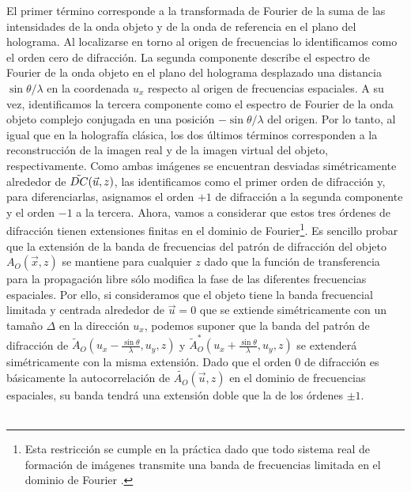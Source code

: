 \documentclass[12pt]{article}
\begin{document}
El primer término corresponde a la transformada de Fourier de la suma de las intensidades  de la onda objeto y de la onda de referencia en el plano del holograma. Al localizarse en torno al origen de frecuencias lo identificamos como el orden cero de difracción. La segunda componente describe el espectro de Fourier de la onda  objeto en el plano del holograma desplazado una distancia $\sin{\theta} /\lambda$ en la coordenada $u_x$ respecto al origen de frecuencias espaciales. A su vez, identificamos la tercera componente como el espectro de Fourier de la onda objeto complejo conjugada en una posición $- \sin{\theta} /\lambda$ del origen. Por lo tanto, al igual que en la holografía clásica,   los dos últimos términos corresponden a la reconstrucción de la imagen real y de la imagen virtual del objeto, respectivamente. Como ambas imágenes se encuentran desviadas simétricamente alrededor de  $\Tilde{DC}(\Vec{u},z)$, las identificamos  como el primer orden de difracción y, para diferenciarlas, asignamos el orden $+1$ de difracción a la segunda componente y el orden $-1$ a la tercera. Ahora, vamos a considerar que estos tres órdenes de difracción tienen extensiones finitas en el dominio de Fourier\footnote{Esta restricción se cumple en la práctica dado que todo sistema real de formación de imágenes transmite una banda  de frecuencias limitada en el dominio de Fourier \cite{13}.}.  Es sencillo probar que la extensión de la banda de frecuencias del patrón de difracción del objeto $A_O (\Vec{x},z)$ se mantiene para cualquier  $z$ dado que la función de transferencia para la propagación libre sólo modifica la fase de las diferentes frecuencias espaciales. Por ello,  si consideramos que el objeto tiene la banda frecuencial limitada y centrada alrededor de $\Vec{u} = 0$ que se extiende simétricamente con un tamaño $\Delta$ en la dirección $u_x$, podemos suponer que la banda del patrón de difracción de $\tilde{A}_O (u_x - \frac{\sin{\theta}}{\lambda}, u_y,z)$ y $\tilde{A}_O^{*} (u_x +\frac{\sin{\theta}}{\lambda}, u_y,z)$ se extenderá simétricamente con la misma extensión. Dado que el orden $0$ de difracción es básicamente la autocorrelación de $\tilde{A_O} (\Vec{u},z)$ en el dominio de frecuencias espaciales, su banda tendrá una extensión doble que la de los órdenes $\pm 1$.\\ \\
\end{document}
